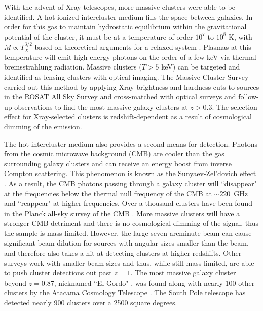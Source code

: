 With the advent of Xray telescopes, more massive clusters were able to be identified. A hot ionized intercluster medium fills the space between galaxies. In order for this gas to maintain hydrostatic equilibrium within the gravitational potential of the cluster, it must be at a temperature of order $10^7$ to $10^8$ K, with $M\propto T_X^{3/2}$ based on theoretical arguments for a relaxed system \citep{Horner:1999rz}. Plasmas at this temperature will emit high energy photons on the order of a few keV via thermal bremsstrahlung radiation. Massive clusters ($T>5$ keV) can be targeted and identified as lensing clusters with optical imaging. The Massive Cluster Survey \citep[MACS; ][]{Ebeling:2001rt} carried out this method by applying Xray brightness and hardness cuts to sources in the ROSAT All Sky Survey and cross-matched with optical surveys and follow-up observations to find the most massive galaxy clusters at $z>0.3$. The selection effect for Xray-selected clusters is redshift-dependent as a result of cosmological dimming of the emission.

The hot intercluster medium also provides a second means for detection. Photons from the cosmic microwave background (CMB) are cooler than the gas surrounding galaxy clusters and can receive an energy boost from inverse Compton scattering. This phenomenon is known as the Sunyaev-Zel'dovich effect \citep{Sunyaev:1972lr}. As a result, the CMB photons passing through a galaxy cluster will ``disappear" at the frequencies below the thermal null frequency of the CMB at $\sim220$~GHz and ``reappear" at higher frequencies. Over a thousand clusters have been found in the Planck all-sky survey of the CMB \citep{Planck-Collaboration:2014gf}. More massive clusters will have a stronger CMB detriment and there is no cosmological dimming of the signal, thus the sample is mass-limited. However, the large seven arcminute beam can cause significant beam-dilution for sources with angular sizes smaller than the beam, and therefore also takes a hit at detecting clusters at higher redshifts. Other surveys work with smaller beam sizes and thus, while still mass-limited, are able to push cluster detections out past $z=1$. The most massive galaxy cluster beyond $z=0.87$, nicknamed ``El Gordo" \citep{Menanteau:2012ul, Menanteau:2010fu}, was found along with nearly 100 other clusters by the Atacama Cosmology Telescope \citep[ACT; ][]{Hasselfield:2013pd,Marriage:2011qf}. The South Pole telescope \citep[SPT; ][]{Bleem:2015gf} has detected nearly 900 clusters over a 2500 square degrees. 

